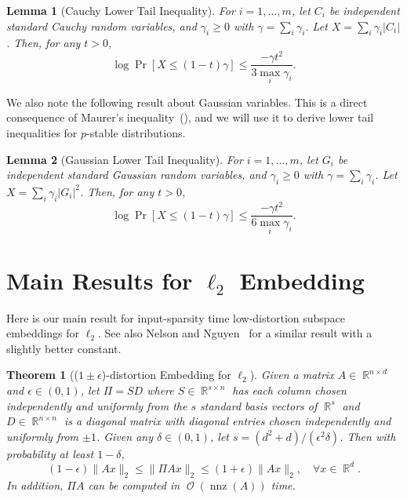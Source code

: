 \documentclass[11pt]{article}
\newtheorem{theorem}{Theorem}
\newtheorem{lemma}{Lemma}
\DeclareMathOperator{\bigO}{\mathcal{O}}
\DeclareMathOperator{\nnz}{nnz}
\DeclareMathOperator{\R}{\mathbb{R}}
\begin{document}
\begin{lemma}[Cauchy Lower Tail Inequality]
  \label{lemma:cauchy_lower}
  For $i=1,\ldots,m$, let $C_i$ be independent standard Cauchy random variables, and
  $\gamma_i \geq 0$ with $\gamma = \sum_i \gamma_i$. 
  Let $X = \sum_i \gamma_i |C_i|$. 
  Then, for any $t>0$,
  \begin{equation*}
    \log \Pr[X \leq (1-t) \gamma] \leq \frac{- \gamma t^2}{3 \max_i \gamma_i}.
  \end{equation*}
\end{lemma}

\noindent
We also note the following result about Gaussian variables.
This is a direct consequence of Maurer's inequality~(\cite{maurer2003bound}),
and we will use it to derive lower tail inequalities for $p$-stable
distributions.

\begin{lemma}[Gaussian Lower Tail Inequality]
  \label{lemma:gaussian_lower}
  For $i=1,\ldots,m$, let $G_i$ be independent standard Gaussian random
  variables, and $\gamma_i \geq 0$ with $\gamma = \sum_i \gamma_i$. 
  Let $X = \sum_i \gamma_i |G_i|^2$. 
  Then, for any $t>0$,
  \begin{equation*}
    \log \Pr[X \leq (1-t) \gamma] \leq \frac{-\gamma t^2}{6 \max_i \gamma_i}.
  \end{equation*}
\end{lemma}




\section{Main Results for $\ell_2$ Embedding}
\label{sxn:l2} 

Here is our main result for input-sparsity time low-distortion subspace
embeddings for $\ell_2$.
See also Nelson and Nguyen~\cite{nelson2012osnap} for a similar result with a
slightly better constant.

\begin{theorem}[($1\pm\epsilon$)-distortion Embedding for $\ell_2$]
  \label{thm:sparse_l2}
  Given a matrix $A \in \R^{n \times d}$ and $\epsilon \in (0, 1)$, let $\Pi = S
  D$ where $S \in \R^{s \times n}$ has each column chosen independently and
  uniformly from the $s$ standard basis vectors of $\R^s$ and $D \in \R^{n
    \times n}$ is a diagonal matrix with diagonal entries chosen independently
  and uniformly from $\pm 1$.
  Given any $\delta \in (0, 1)$, let $s = (d^2 + d) / (\epsilon^2 \delta)$.
  Then with probability at least $1-\delta$,
  \begin{equation*}
    (1-\epsilon) \|A x\|_2 \leq \| \Pi A x \|_2 \leq (1+\epsilon) \|A x\|_2, \quad \forall x \in \R^d.
  \end{equation*}
  In addition, $\Pi A$ can be computed in $\bigO(\nnz(A))$ time.
\end{theorem}
\end{document}

